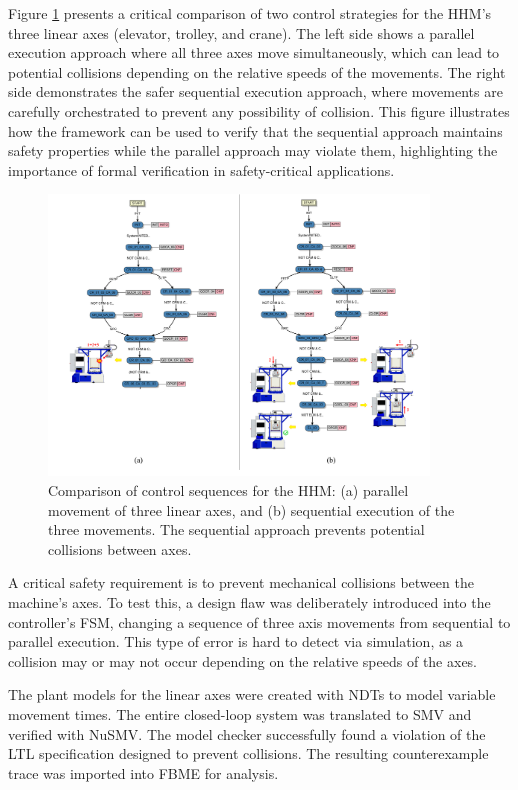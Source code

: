 Figure \ref{fig:hhm_control_sequences} presents a critical comparison of two control strategies for the HHM's three linear axes (elevator, trolley, and crane). The left side shows a parallel execution approach where all three axes move simultaneously, which can lead to potential collisions depending on the relative speeds of the movements. The right side demonstrates the safer sequential execution approach, where movements are carefully orchestrated to prevent any possibility of collision. This figure illustrates how the framework can be used to verify that the sequential approach maintains safety properties while the parallel approach may violate them, highlighting the importance of formal verification in safety-critical applications.

\begin{figure}[h]
\centering
\includegraphics[width=0.9\textwidth]{chapters/images/chapter2/lilli09-eps-converted-to.pdf}
\caption{Comparison of control sequences for the HHM: (a) parallel movement of three linear axes, and (b) sequential execution of the three movements. The sequential approach prevents potential collisions between axes.}
\label{fig:hhm_control_sequences}
\end{figure}

A critical safety requirement is to prevent mechanical collisions between the machine's axes. To test this, a design flaw was deliberately introduced into the controller's FSM, changing a sequence of three axis movements from sequential to parallel execution. This type of error is hard to detect via simulation, as a collision may or may not occur depending on the relative speeds of the axes.

The plant models for the linear axes were created with NDTs to model variable movement times. The entire closed-loop system was translated to SMV and verified with NuSMV. The model checker successfully found a violation of the LTL specification designed to prevent collisions. The resulting counterexample trace was imported into FBME for analysis.

